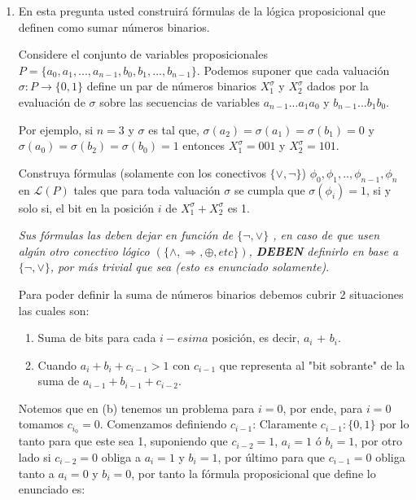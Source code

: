 \documentclass[10pt]{article}
\begin{document}
\begin{enumerate}
\begin{enumerate}
        
    \end{enumerate}
    \item En esta pregunta usted construirá fórmulas de la lógica proposicional que definen como sumar números
    binarios.

    Considere el conjunto de variables proposicionales \newline 
    $P=\{a_0, a_1, ... , a_{n-1},b_0, b_1, ..., b_{n-1}\}$.
    Podemos suponer que cada valuación $\sigma : P\rightarrow\{0,1\}$ define un par de números binarios $X^{\sigma}_1$ 
    y $X^{\sigma}_2$ dados por la evaluación de $\sigma$ sobre las secuencias de variables $a_{n-1}...a_1a_0 $ y 
    $b_{n-1}...b_1b_0$.
    
    Por ejemplo, si $n=3$ y $\sigma$ es tal que, $\sigma(a_2)=\sigma(a_1)=\sigma(b_1)=0$ y 
    $\sigma(a_0)=\sigma(b_2)=\sigma(b_0)=1$ entonces $X^{\sigma}_1=001$ y $X^{\sigma}_2=101$.

    Construya fórmulas (solamente con los conectivos $\{\vee ,\neg\}$) $\phi_0,\phi_1,..,\phi_{n-1},\phi_n$ en $\mathcal{L}(P)$
    tales que para toda valuación $\sigma$ se cumpla que $\sigma(\phi_i)=1$, si y solo si, el bit en la posición $i$
    de $X^{\sigma}_1+X^{\sigma}_2$ es 1.

    \textit{Sus fórmulas las deben dejar en función de $\{ \neg, \vee\}$ , en caso de que usen algún otro conectivo
    lógico $(\{ \wedge ,\Rightarrow,\oplus, etc\})$, \textbf{DEBEN} definirlo en base a $\{ \neg, \vee \}$, por más trivial que sea 
    (esto es enunciado solamente)}.

    Para poder definir la suma de números binarios debemos cubrir 2 situaciones las cuales son:
    \begin{enumerate}
        \item Suma de bits para cada $i-esima$ posición, es decir, $a_i$ + $b_i$.
        \item Cuando $a_i+b_i+c_{i-1}>1$ con $c_{i-1}$ que representa al "bit sobrante" de la suma de $a_{i-1}+b_{i-1}+c_{i-2}$.
    \end{enumerate}

    Notemos que en (b) tenemos un problema para $i=0$, por ende, para $i=0$ tomamos $c_{i_{0}}=0$. Comenzamos definiendo 
    $c_{i-1}$: Claramente $c_{i-1}:\{0,1\}$ por lo tanto para que este sea 1, suponiendo que $c_{i-2}=1$,
    $a_{i}=1$ ó $b_{i}=1$, por otro lado si $c_{i-2}=0$ obliga a $a_i=1$ y $b_i=1$, por último para que $c_{i-1}=0$ obliga tanto a 
    $a_i=0$ y $b_i=0$, por tanto la fórmula proposicional que define lo enunciado es:



\end{enumerate}
\end{document}
